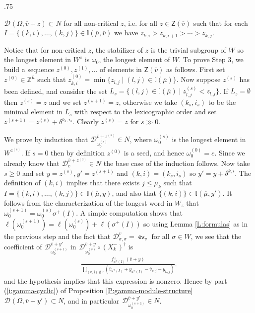 \documentclass[11pt,fleqn]{amsart}
\makeatletter
\renewcommand\proofname{Proof}
\renewenvironment{proof}[1][\textit{\proofname}]{\par
 \pushQED{\qed}%
 \normalfont \topsep.75\paraskip\relax
 \trivlist
 \item[\hskip\labelsep
 \itshape
 #1\@addpunct{.}]\ignorespaces
}{%
 \popQED\endtrivlist\@endpefalse
}
\newcounter{para}[section]
\newcommand\ZZ{\mathbb Z}
\newcommand\II{\mathbb I}
\newcommand\DD[3]{{}^{#1} \mathcal D_{#2}^{#3}}
\newcommand\Z{\mathsf Z}
\newcommand\vv{\overline{v}}
\DeclareMathOperator\ev{\mathsf{ev}}
\makeatother
\begin{document}
\begin{proof}
$\DD{}{}{}(\Omega, \vv + z) \subset N$ for all non-critical $z$, i.e. for all 
$z \in \Z(\vv)$ such that for each $I =\{(k,i), \ldots, (k,j)\} \in 
\II(\overline \mu, \vv)$ we have $z_{k,i} > z_{k,i+1} > \cdots > z_{k,j}$. 

Notice that for non-critical $z$, the stabilizer of $z$ is the trivial 
subgroup of $W$ so the longest element in $W^z$ is $\omega_0$, the 
longest element of $W$. To prove Step 3,  we build a sequence $z^{(0)}, 
z^{(1)}, \ldots$ of elements in $\Z(\vv)$ as follows. First set $z^{(0)} \in 
\ZZ^{\overline \mu}$ such that $z^{(0)}_{k,i} = \min\{z_{l,j} \mid (l,j) \in 
\II(\overline \mu)\}$. Now suppose $z^{(s)}$ has been defined, and consider 
the set $L_s = \{(l,j) \in \II(\overline \mu) \mid z^{(s)}_{l,j} < z_{l,j}\}$. 
If $L_z = \emptyset$ then $z^{(s)} = z$ and we set $z^{(s+1)} = z$, otherwise 
we take $(k_s, i_s)$ to be the minimal element in $L_s$ with respect to the 
lexicographic order and set $z^{(s+1)} = z^{(s)} + \delta^{k_s, i_s}$. Clearly 
$z^{(s)} = z$ for $s \gg 0$. 

We prove by induction that $\DD{}{\omega_0^{(s)}}{\vv + z^{(s)}} \in N$, where 
$\omega_0^{(s)}$ is the longest element in $W^{z^{(s)}}$.  If $s = 0$ then by 
definition $z^{(0)}$ is a seed, and hence $\omega_0^{(0)} = e$. Since we 
already know that $\DD{}{e}{\vv + z^{(0)}} \in N$ the base case 
of the induction follows. Now take $s \geq 0$ and set $y = z^{(s)}, y' = 
z^{(s+1)}$ and $(k,i) = (k_s, i_s)$ so $y' = y + \delta^{k,i}$. The definition
of $(k,i)$ implies that there exists $j \leq \mu_k$ such that $I = \{(k,i),
\ldots, (k,j)\} \in \II(\overline \mu, y)$, and also that $\{(k,i)\} \in 
\II(\overline \mu, y')$. It follows from the characterization of the longest 
word in $W_z$ that $\omega_0^{(s+1)} = \omega_0^{(s)} \sigma^+(I)$. A 
simple computation shows that $\ell(\omega_0^{(s+1)}) = \ell(\omega_0^{(s)})
+ \ell(\sigma^+(I))$ so using Lemma \ref{L:formulas} as in the previous step
and the fact that $\DD{}{\sigma, \sigma}{v} = \ev_v$ for all $\sigma \in W$, 
we see that the coefficient of $\DD{}{\omega_0^{(s+1)}}{\vv + y'}$ in 
$\DD{}{\omega_0^{(s)}}{\vv + y} \circ (X_k^-)^\dagger$ is
\begin{align*}
\frac{f_{a^\mp(I)}^\pm(\vv + y)}{\displaystyle
	\prod_{(k,j) \notin I} (\vv_{a^\mp(I)} + y_{a^\mp(I)} 
	      - \vv_{k,j} - y_{k,j})}.
\end{align*}
and the hypothesis implies that this expression is nonzero. Hence by part 
(\ref{i:gamma-cyclic}) of Proposition \ref{P:gamma-module-structure} 
$\DD{}{}{}(\Omega, \vv + y') \subset N$, and in particular 
$\DD{}{\omega_0^{(s+1)}}{\vv + y'} \in N$.


\end{proof}
\end{document}
